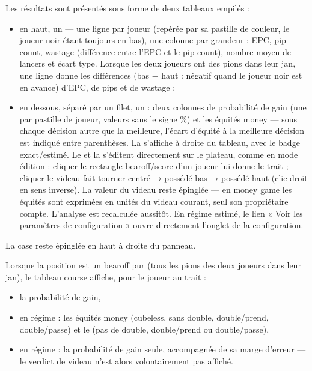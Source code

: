 \documentclass[letterpaper,10pt,french]{sphinxmanual}
\begin{document}
\sphinxAtStartPar
Les résultats sont présentés sous forme de deux tableaux empilés :
\begin{itemize}
\item {} 
\sphinxAtStartPar
en haut, un  — une ligne par joueur (repérée par
sa pastille de couleur, le joueur noir étant toujours en bas), une
colonne par grandeur : EPC, pip count, wastage (différence entre l’EPC
et le pip count), nombre moyen de lancers et écart type. Lorsque les
deux joueurs ont des pions dans leur jan, une ligne  donne les
différences  (bas − haut : négatif quand le joueur noir est en
avance) d’EPC, de pips et de wastage ;

\item {} 
\sphinxAtStartPar
en dessous, séparé par un filet, un  : deux
colonnes de probabilité de gain (une par pastille de joueur, valeurs
sans le signe \%) et les équités money — sous chaque décision autre que
la meilleure, l’écart d’équité à la meilleure décision est indiqué
entre parenthèses. La  s’affiche à droite du tableau, avec
le badge exact/estimé. Le  et la 
s’éditent directement sur le plateau, comme en mode édition : cliquer
le rectangle bearoff/score d’un joueur lui donne le trait ; cliquer le
videau fait tourner centré → possédé bas → possédé haut (clic droit en
sens inverse). La valeur du videau reste épinglée — en money game les
équités sont exprimées en unités du videau courant, seul son
propriétaire compte. L’analyse est recalculée aussitôt. En régime
estimé, le lien « Voir les paramètres de configuration » ouvre
directement l’onglet  de la configuration.

\end{itemize}

\sphinxAtStartPar
La case  reste épinglée en haut à droite du panneau.

\sphinxAtStartPar
Lorsque la position est un bearoff pur (tous les pions des deux joueurs dans
leur jan), le tableau course affiche, pour le joueur au trait :
\begin{itemize}
\item {} 
\sphinxAtStartPar
la probabilité de gain,

\item {} 
\sphinxAtStartPar
en régime  : les équités money (cubeless, sans double, double/prend,
double/passe) et le  (pas de double, double/prend
ou double/passe),

\item {} 
\sphinxAtStartPar
en régime  : la probabilité de gain seule, accompagnée de sa marge
d’erreur — le verdict de videau n’est alors volontairement pas affiché.

\end{itemize}
\end{document}
